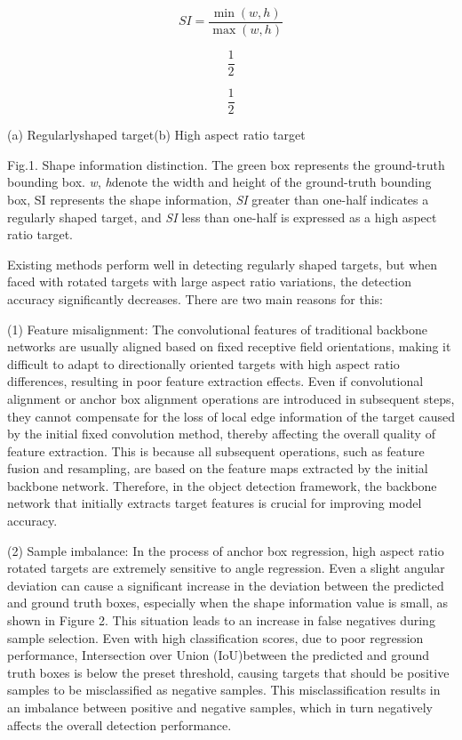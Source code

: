 \documentclass[journal]{IEEEtran}
\begin{document}
\begin{equation}
SI = \frac{\min(w, h)}{\max(w, h)}
\label{eq:eq_1}
\end{equation}

\begin{equation}
\frac{1}{2}
\label{eq:eq_2}
\end{equation}

\begin{equation}
\frac{1}{2}
\label{eq:eq_3}
\end{equation}

(a) Regularlyshaped target(b) High aspect ratio target

Fig.1. Shape information distinction. The green box represents the ground-truth bounding box. \textit{w}, \textit{h}denote the width and height of the ground-truth bounding box, SI represents the shape information, \textit{SI} greater than one-half indicates a regularly shaped target, and\textit{ SI} less than one-half is expressed as a high aspect ratio target.

Existing methods perform well in detecting regularly shaped targets, but when faced with rotated targets with large aspect ratio variations, the detection accuracy significantly decreases. There are two main reasons for this:

(1) Feature misalignment: The convolutional features of traditional backbone networks are usually aligned based on fixed receptive field orientations, making it difficult to adapt to directionally oriented targets with high aspect ratio differences, resulting in poor feature extraction effects. Even if convolutional alignment or anchor box alignment operations are introduced in subsequent steps, they cannot compensate for the loss of local edge information of the target caused by the initial fixed convolution method, thereby affecting the overall quality of feature extraction. This is because all subsequent operations, such as feature fusion and resampling, are based on the feature maps extracted by the initial backbone network. Therefore, in the object detection framework, the backbone network that initially extracts target features is crucial for improving model accuracy.

(2) Sample imbalance: In the process of anchor box regression, high aspect ratio rotated targets are extremely sensitive to angle regression. Even a slight angular deviation can cause a significant increase in the deviation between the predicted and ground truth boxes, especially when the shape information value is small, as shown in Figure 2. This situation leads to an increase in false negatives during sample selection. Even with high classification scores, due to poor regression performance, Intersection over Union (IoU)between the predicted and ground truth boxes is below the preset threshold, causing targets that should be positive samples to be misclassified as negative samples. This misclassification results in an imbalance between positive and negative samples, which in turn negatively affects the overall detection performance.
\end{document}
